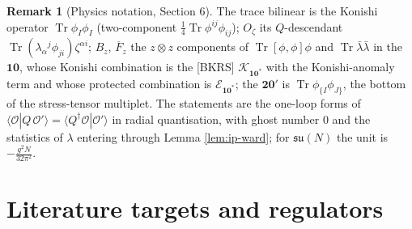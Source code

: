 \documentclass[11pt]{report}
\theoremstyle{plain}
\theoremstyle{definition}
\newtheorem{remark}[theorem]{Remark}
\numberwithin{equation}{chapter}
\begin{document}
\begin{remark}[Physics notation, Section 6]
The trace bilinear is the Konishi operator $\operatorname{Tr}\phi_I\phi_I$ (two-component $\tfrac14\operatorname{Tr}\phi^{ij}\phi_{ij}$); $O_\zeta$ its $Q$-descendant $\operatorname{Tr}(\lambda_\alpha{}^j\phi_{ji})\zeta^{\alpha i}$; $B_z$, $\overline F_z$ the $z\otimes z$ components of $\operatorname{Tr}[\phi,\phi]\phi$ and $\operatorname{Tr}\bar\lambda\bar\lambda$ in the $\mathbf{10}$, whose Konishi combination is the [BKRS] $\mathcal K_{\mathbf{10}^*}$ with the Konishi-anomaly term and whose protected combination is $\mathcal E_{\mathbf{10}^*}$; the $\mathbf{20'}$ is $\operatorname{Tr}\phi_{\{I}\phi_{J\}}$, the bottom of the stress-tensor multiplet. The statements are the one-loop forms of $\langle\mathcal O|Q\,\mathcal O'\rangle=\langle Q^\dagger\mathcal O|\mathcal O'\rangle$ in radial quantisation, with ghost number $0$ and the statistics of $\lambda$ entering through Lemma \ref{lem:ip-ward}; for $\mathfrak{su}(N)$ the unit is $-\tfrac{g^2N}{32\pi^2}$.
\end{remark}

\section{Literature targets and regulators}
\end{document}
